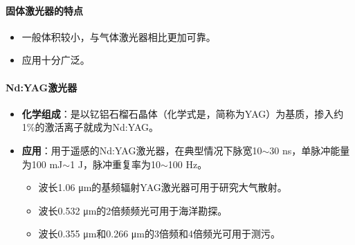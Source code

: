 \paragraph{固体激光器的特点}\begin{itemize}
	\item 一般体积较小，与气体激光器相比更加可靠。
	\item 应用十分广泛。
\end{itemize}

\paragraph{Nd:YAG激光器} \begin{itemize}
	\item \textbf{化学组成}：是以钇铝石榴石晶体（化学式是，简称为YAG）为基质，掺入约1\%的激活离子就成为Nd:YAG。
	\item \textbf{应用}：用于遥感的Nd:YAG激光器，在典型情况下脉宽10$ \sim $30 ns，单脉冲能量为100 mJ$ \sim $1 J，脉冲重复率为10$ \sim $100 Hz。
		\begin{itemize}
			\item 波长1.06 μm的基频辐射YAG激光器可用于研究大气散射。
			\item 波长0.532 μm的2倍频频光可用于海洋勘探。
			\item 波长0.355 μm和0.266 μm的3倍频和4倍频光可用于测污。
		\end{itemize}
\end{itemize}

